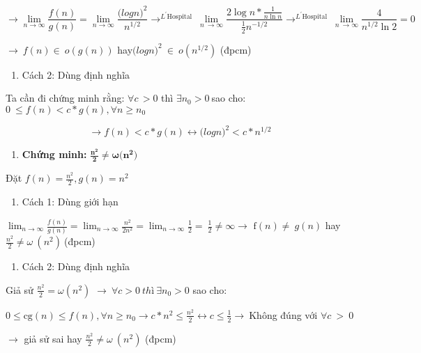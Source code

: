 \documentclass[
]{article}
\begin{document}
\[\rightarrow \lim_{n \rightarrow \infty}\frac{f(n)}{g(n)} = \lim_{n \rightarrow \infty}\frac{{{(log}{n)}}^{2}}{n^{1\text{/}2}} \rightarrow^{L^{'}\text{Hospital}}\ \lim_{n\  \rightarrow \infty}{\frac{2\log n*\frac{1}{n\ln n}}{\frac{1}{2}n^{- 1\text{/}2}} \rightarrow^{L^{'}\text{Hospital}}}\ \lim_{n\  \rightarrow \infty}\frac{4}{n^{1/2}\ln 2} = 0\ \]

\(\rightarrow \ f(n) \in \ o(g(n))\)
hay\({{(log}{n)}}^{2}\  \in \ o(n^{1/2})\) (đpcm)

\begin{enumerate}
\item
  Cách 2: Dùng định nghĩa
\end{enumerate}

Ta cần đi chứng minh rằng: \(\forall c\, > 0\) thì
\(\exists n_{0} > 0\ \)sao cho:
\(0\  \leq f(n) < c*g(n),\forall n \geq n_{0}\)

\[\rightarrow f(n) < c*g(n) \leftrightarrow {{(log}{n)}}^{2} < c*n^{1/2}\ \]

\begin{enumerate}
\item
  \textbf{Chứng minh:}
  \(\frac{\mathbf{n}^{\mathbf{2}}}{\mathbf{2}}\mathbf{\neq \omega(}\mathbf{n}^{\mathbf{2}}\mathbf{)}\)
\end{enumerate}

Đặt \(f(n) = \frac{n^{2}}{2},g(n) = n^{2}\)

\begin{enumerate}
\item
  Cách 1: Dùng giới hạn
\end{enumerate}

\(\lim_{n \rightarrow \infty}\frac{f(n)}{g(n)} = \lim_{n \rightarrow \infty}\frac{n^{2}}{2n^{2}} = \lim_{n \rightarrow \infty}\frac{1}{2} = \ \frac{1}{2} \neq \infty \rightarrow \text{\ f}(n) \neq \ g(n)\)
hay \(\frac{n^{2}}{2} \neq \omega\ (n^{2})\ \)(đpcm)

\begin{enumerate}
\item
  Cách 2: Dùng định nghĩa
\end{enumerate}

Giả sử \(\frac{n^{2}}{2} = \omega\left( n^{2} \right)\)
\(\rightarrow \ \forall c > 0\ thì\ \exists n_{0} > 0\) sao cho:

\(0 \leq \text{cg}(n) \leq f(n),\forall n \geq n_{0} \rightarrow c*n^{2} \leq \frac{n^{2}}{2} \leftrightarrow c \leq \frac{1}{2} \rightarrow \ \)Không
đúng với \(\forall c\  > \ 0\)

\(\rightarrow\) giả sử sai hay \(\frac{n^{2}}{2} \neq \omega\ (n^{2})\)
(đpcm)
\end{document}
